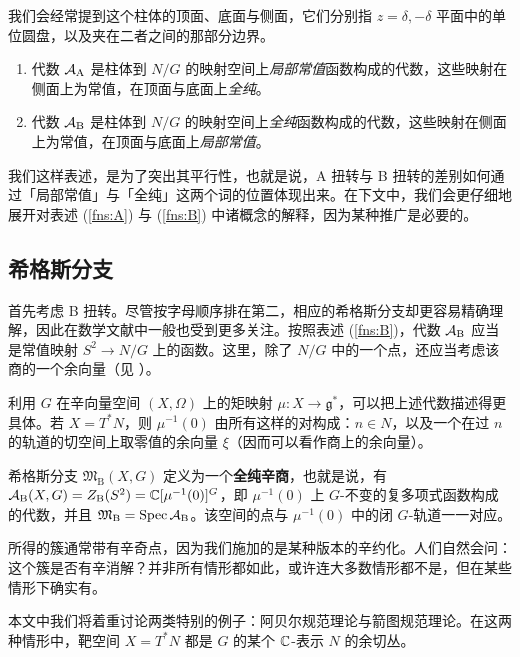 我们会经常提到这个柱体的顶面、底面与侧面，它们分别指 $z=\delta,-\delta$ 平面中的单位圆盘，以及夹在二者之间的那部分边界。
\begin{enumerate}[label=\Alph*., ref=\Alph*]
     \item \label{fns:A} 代数 $\mathcal{A}_{\operatorname{A}}$ 是柱体到 $N/G$ 的映射空间上\emph{局部常值}函数构成的代数，这些映射在侧面上为常值，在顶面与底面上\emph{全纯}。
    \item \label{fns:B} 代数 $\mathcal{A}_{\operatorname{B}}$ 是柱体到 $N/G$ 的映射空间上\emph{全纯}函数构成的代数，这些映射在侧面上为常值，在顶面与底面上\emph{局部常值}。
\end{enumerate}
我们这样表述，是为了突出其平行性，也就是说，A 扭转与 B 扭转的差别如何通过「局部常值」与「全纯」这两个词的位置体现出来。在下文中，我们会更仔细地展开对表述 (\ref{fns:A}) 与 (\ref{fns:B}) 中诸概念的解释，因为某种推广是必要的。

\subsection{希格斯分支}

首先考虑 B 扭转。尽管按字母顺序排在第二，相应的希格斯分支却更容易精确理解，因此在数学文献中一般也受到更多关注。按照表述 (\ref{fns:B})，代数 $\mathcal{A}_{\operatorname{B}}$ 应当是常值映射 $S^2\to N/G$ 上的函数。这里，除了 $N/G$ 中的一个点，还应当考虑该商的一个余向量（见 \cite[\S 7.14]{bravermanCoulombBranches2018}）。

利用 $G$ 在辛向量空间 $(X,\Omega)$ 上的矩映射 $\mu\colon X\to \mathfrak{g}^*$，可以把上述代数描述得更具体。若 $X=T^*N$，则 $\mu^{-1}(0)$ 由所有这样的对构成：$n\in N$，以及一个在过 $n$ 的轨道的切空间上取零值的余向量 $\xi$（因而可以看作商上的余向量）。
\begin{definition}
	希格斯分支 $\mathfrak{M}_{\operatorname{B}}(X,G)$ 定义为一个{\bf 全纯辛商}，也就是说，有 $\mathcal{A}_{\operatorname{B}}(X,G)=Z_{\operatorname{B}}(S^2)=\mathbb{C}[\mu^{-1}(0)]^G$，即 $\mu^{-1}(0)$ 上 $G$-不变的复多项式函数构成的代数，并且 $\mathfrak{M}_{\operatorname{B}}=\operatorname{Spec}\mathcal{A}_{\operatorname{B}}$。该空间的点与 $\mu^{-1}(0)$ 中的闭 $G$-轨道一一对应。
\end{definition}

所得的簇通常带有辛奇点，因为我们施加的是某种版本的辛约化。人们自然会问：这个簇是否有辛消解？并非所有情形都如此，或许连大多数情形都不是，但在某些情形下确实有。

本文中我们将着重讨论两类特别的例子：阿贝尔规范理论与箭图规范理论。在这两种情形中，靶空间 $X=T^*N$ 都是 $G$ 的某个 $\mathbb{C}$-表示 $N$ 的余切丛。

